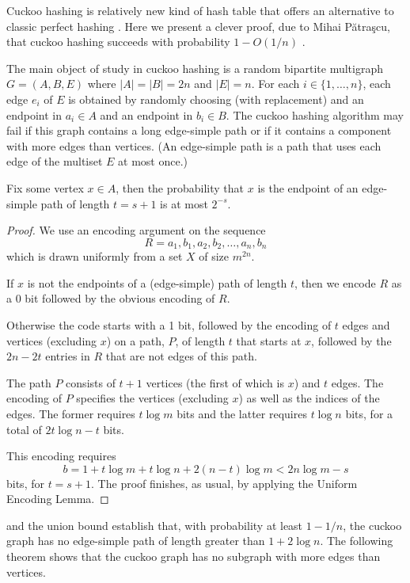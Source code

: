 \documentclass{patmorin}
\begin{document}
Cuckoo hashing is relatively new kind of hash table that offers an
alternative to classic perfect hashing \cite{pagh.rodler:cuckoo}. Here we present a clever proof,
due to Mihai Pătraşcu, that cuckoo hashing succeeds with probability
$1-O(1/n)$ \cite{patrascu:cuckoo}.

The main object of study in cuckoo hashing is a random bipartite
multigraph $G=(A,B,E)$ where $|A|=|B|=2n$ and $|E|=n$.  For each
$i\in\{1,\ldots,n\}$, each edge $e_i$ of $E$ is obtained by randomly
choosing (with replacement) and an endpoint in $a_i\in A$ and an endpoint
in $b_i\in B$.  The cuckoo hashing algorithm may fail if this graph
contains a long edge-simple path or if it contains a component with more
edges than vertices.  (An edge-simple path is a path that uses each edge
of the multiset $E$ at most once.)

\begin{thm}
  Fix some vertex $x\in A$, then the probability that $x$ is the endpoint
  of an edge-simple path of length $t=s+1$ is at most $2^{-s}$.
\end{thm}

\begin{proof}
  We use an encoding argument on the sequence
  \[
     R=a_1,b_1,a_2,b_2,\ldots,a_n,b_n
  \]
  which is drawn uniformly from a set $X$ of size $m^{2n}$.
  
  If $x$ is not the endpoints of a (edge-simple) path of length $t$,
  then we encode $R$ as a 0 bit followed by the obvious encoding of $R$.

  Otherwise the code starts with a 1 bit, followed by the encoding of
  $t$ edges and vertices (excluding $x$) on a path, $P$, of length $t$ that
  starts at $x$, followed by the $2n-2t$ entries in $R$ that are
  not edges of this path.  

  The path $P$ consists of $t+1$ vertices (the first of which is $x$) and
  $t$ edges. The encoding of $P$ specifies the vertices (excluding $x$)
  as well as the indices of the edges. The former requires $t\log m$ bits
  and the latter requires $t\log n$ bits, for a total of $2t\log n-t$ bits.


This encoding requires
  \[
    b = 1 + t\log m + t\log n + 2(n-t)\log m < 2n\log m - s
  \]
  bits, for $t=s+1$. The proof finishes, as usual, by applying the
  Uniform Encoding Lemma.
\end{proof}

 and the union bound establish that, with probability
at least $1-1/n$, the cuckoo graph has no edge-simple path of length
greater than $1+2\log n$. The following theorem shows that the cuckoo
graph has no subgraph with more edges than vertices.
\end{document}
